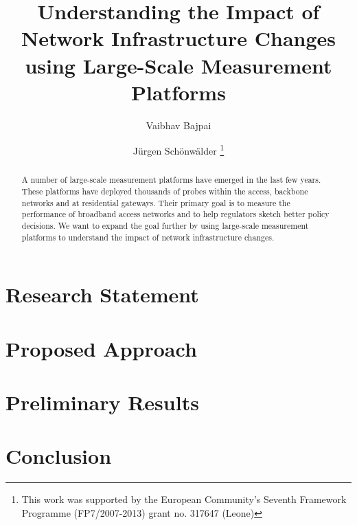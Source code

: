 \documentclass[a4paper]{llncs}
\begin{document}
\mainmatter  %

\title{Understanding the Impact of Network Infrastructure Changes using
Large-Scale Measurement Platforms}


\author{Vaibhav Bajpai \and Jürgen Schönwälder%
\thanks{This work was supported by the European Community’s Seventh Framework
Programme (FP7/2007-2013) grant no. 317647 (Leone)}}
\maketitle

\begin{abstract}

A number of large-scale measurement platforms have emerged in the last few
years. These platforms have deployed thousands of probes within the access,
backbone networks and at residential gateways.  Their primary goal is to
measure the performance of broadband access networks and to help regulators
sketch better policy decisions. We want to expand the goal further by using
large-scale measurement platforms to understand the impact of network
infrastructure changes.

\end{abstract}


\section{Research Statement}
\label{sec:rstatement}
\section{Proposed Approach}
\label{sec:approach}
\section{Preliminary Results}
\label{sec:preliminaryresults}
\section{Conclusion}
\label{sec:conclusion}





\end{document}
